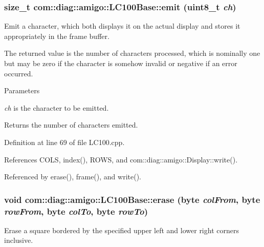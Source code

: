\hypertarget{classcom_1_1diag_1_1amigo_1_1LC100Base_adad20089d65b5744e062a7b02fc14ef6}{
\subsubsection[{emit}]{\setlength{\rightskip}{0pt plus 5cm}size\_\-t com::diag::amigo::LC100Base::emit (uint8\_\-t {\em ch})}}
\label{classcom_1_1diag_1_1amigo_1_1LC100Base_adad20089d65b5744e062a7b02fc14ef6}


Emit a character, which both displays it on the actual display and stores it appropriately in the frame buffer. 

The returned value is the number of characters processed, which is nominally one but may be zero if the character is somehow invalid or negative if an error occurred. 
\begin{DoxyParams}{Parameters}
\item[{\em ch}]is the character to be emitted. \end{DoxyParams}
\begin{DoxyReturn}{Returns}
the number of characters emitted. 
\end{DoxyReturn}


Definition at line 69 of file LC100.cpp.



References COLS, index(), ROWS, and com::diag::amigo::Display::write().



Referenced by erase(), frame(), and write().

\hypertarget{classcom_1_1diag_1_1amigo_1_1LC100Base_a4a92d06a7c79b66d6fa47581c727f688}{
\subsubsection[{erase}]{\setlength{\rightskip}{0pt plus 5cm}void com::diag::amigo::LC100Base::erase (byte {\em colFrom}, \/  byte {\em rowFrom}, \/  byte {\em colTo}, \/  byte {\em rowTo})}}
\label{classcom_1_1diag_1_1amigo_1_1LC100Base_a4a92d06a7c79b66d6fa47581c727f688}


Erase a square bordered by the specified upper left and lower right corners inclusive. 

